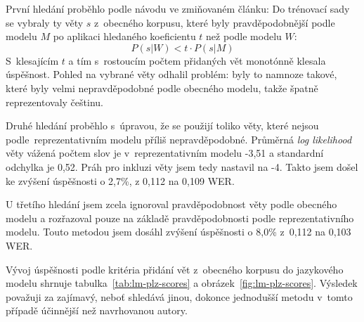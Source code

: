 První hledání proběhlo podle návodu ve zmiňovaném článku: Do trénovací sady
se vybraly ty věty $s$ z~obecného korpusu, které byly pravděpodobnější podle
modelu $M$ po aplikaci hledaného koeficientu $t$ než podle modelu $W$:
\begin{equation}
P(s|W) < t\cdot{}P(s|M)
\end{equation}
S~klesajícím $t$ a tím s~rostoucím počtem přidaných vět monotónně klesala
úspěšnost. Pohled na vybrané věty odhalil problém: byly to namnoze takové, které
byly velmi nepravděpodobné podle obecného modelu, takže špatně reprezentovaly
češtinu.

Druhé hledání proběhlo s~úpravou, že se použijí toliko věty, které nejsou
podle~reprezentativním modelu příliš nepravděpodobné. Průměrná \textit{log
likelihood} věty vážená počtem slov je v~reprezentativním modelu -3,51 a
standardní odchylka je 0,52. Práh pro inkluzi věty jsem tedy nastavil na -4.
Takto jsem došel ke zvýšení úspěšnosti o 2,7\%, z 0,112 na 0,109 WER.

U třetího hledání jsem zcela ignoroval pravděpodobnost věty podle obecného
modelu a rozřazoval pouze na základě pravděpodobnosti podle reprezentativního
modelu. Touto metodou jsem dosáhl zvýšení úspěšnosti o 8,0\% z~0,112 na 0,103
WER.

Vývoj úspěšnosti podle kritéria přidání vět z~obecného korpusu do jazykového
modelu shrnuje tabulka~\ref{tab:lm-plz-scores} a
obrázek~\ref{fig:lm-plz-scores}.
Výsledek považuji za zajímavý, neboť shledává jinou, dokonce jednodušší metodu
v~tomto případě účinnější než navrhovanou autory.

